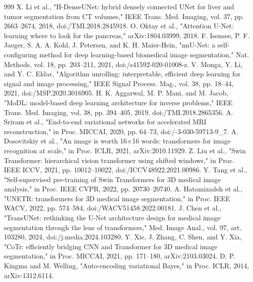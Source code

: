 \documentclass[journal,twoside,web]{ieeecolor}
\begin{document}
\begin{thebibliography}{999}
 X. Li et al., "H-DenseUNet: hybrid densely connected UNet for liver and tumor segmentation from CT volumes," IEEE Trans. Med. Imaging, vol. 37, pp. 2663--2674, 2018, doi:/\allowbreak TMI.2018.2845918.
 O. Oktay et al., "Attention U-Net: learning where to look for the pancreas," arXiv:1804.03999, 2018.
 F. Isensee, P. F. Jaeger, S. A. A. Kohl, J. Petersen, and K. H. Maier-Hein, "nnU-Net: a self-configuring method for deep learning-based biomedical image segmentation," Nat. Methods, vol. 18, pp. 203--211, 2021, doi:/\allowbreak s41592-020-01008-z.
 V. Monga, Y. Li, and Y. C. Eldar, "Algorithm unrolling: interpretable, efficient deep learning for signal and image processing," IEEE Signal Process. Mag., vol. 38, pp. 18--44, 2021, doi:/\allowbreak MSP.2020.3016905.
 H. K. Aggarwal, M. P. Mani, and M. Jacob, "MoDL: model-based deep learning architecture for inverse problems," IEEE Trans. Med. Imaging, vol. 38, pp. 394--405, 2019, doi:/\allowbreak TMI.2018.2865356.
 A. Sriram et al., "End-to-end variational networks for accelerated MRI reconstruction," in Proc. MICCAI, 2020, pp. 64--73, doi:/-3-030-59713-9\_7.
 A. Dosovitskiy et al., "An image is worth 16$\times$16 words: transformers for image recognition at scale," in Proc. ICLR, 2021, arXiv:2010.11929.
 Z. Liu et al., "Swin Transformer: hierarchical vision transformer using shifted windows," in Proc. IEEE ICCV, 2021, pp. 10012--10022, doi:/\allowbreak ICCV48922.2021.00986.
 Y. Tang et al., "Self-supervised pre-training of Swin Transformers for 3D medical image analysis," in Proc. IEEE CVPR, 2022, pp. 20730--20740.
 A. Hatamizadeh et al., "UNETR: transformers for 3D medical image segmentation," in Proc. IEEE WACV, 2022, pp. 574--584, doi:/\allowbreak WACV51458.2022.00181.
 J. Chen et al., "TransUNet: rethinking the U-Net architecture design for medical image segmentation through the lens of transformers," Med. Image Anal., vol. 97, art. 103280, 2024, doi:/\allowbreak j.media.2024.103280.
 Y. Xie, J. Zhang, C. Shen, and Y. Xia, "CoTr: efficiently bridging CNN and Transformer for 3D medical image segmentation," in Proc. MICCAI, 2021, pp. 171--180, arXiv:2103.03024.
 D. P. Kingma and M. Welling, "Auto-encoding variational Bayes," in Proc. ICLR, 2014, arXiv:1312.6114.

\end{thebibliography}
\end{document}

